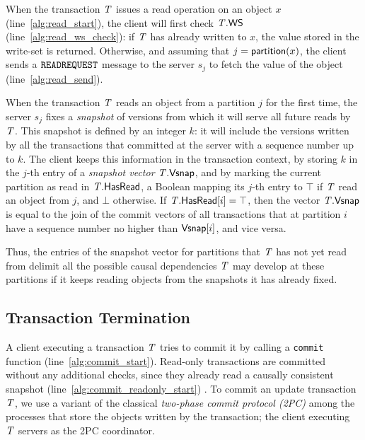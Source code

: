 When the transaction $\mathit{T}$ issues a read operation on an object $x$ (line~\ref{alg:read_start}), the client will first check $\mathit{T}.\mathsf{WS}$ (line~\ref{alg:read_ws_check}): if $\mathit{T}$ has already written to $x$, the value stored in the write-set is returned. Otherwise, and assuming that $j = \mathsf{partition}(x)$, the client sends a ${\tt READREQUEST}$ message to the server $s_j$ to fetch the value of the object (line~\ref{alg:read_send}).

When the transaction $\mathit{T}$ reads an object from a partition $j$ for the first time, the server $s_j$ fixes a \emph{snapshot} of versions from which it will serve all future reads by $\mathit{T}$. This snapshot is defined by an integer $k$: it will include the versions written by all the transactions that committed at the server with a sequence number up to $k$. The client keeps this information in the transaction context, by storing $k$ in the $j$-th entry of a \emph{snapshot vector} $\mathit{T}.\mathsf{Vsnap}$, and by marking the current partition as read in $\mathit{T}.\mathsf{HasRead}$, a Boolean mapping its $j$-th entry to $\top$ if $\mathit{T}$ read an object from $j$, and $\bot$ otherwise. If $\mathit{T}.\mathsf{HasRead}[i]=\top$, then the vector $\mathit{T}.\mathsf{Vsnap}$ is equal to the join of the commit vectors of all transactions that at partition $i$ have a sequence number no higher than $\mathsf{Vsnap}[i]$, and vice versa.

 Thus, the entries of the snapshot vector for partitions that $\mathit{T}$ has not yet read from delimit all the possible causal dependencies $\mathit{T}$ may develop at these partitions if it keeps reading objects from the snapshots it has already fixed.


\subsection{Transaction Termination}

A client executing a transaction $\mathit{T}$ tries to commit it by calling a {\tt commit} function (line~\ref{alg:commit_start}). Read-only transactions are committed without any additional checks, since they already read a causally consistent snapshot (line~\ref{alg:commit_readonly_start}) . To commit an update transaction $\mathit{T}$, we use a variant of the classical \emph{two-phase commit protocol (2PC)}  among the processes that store the objects written by the transaction; the client executing $\mathit{T}$ servers as the 2PC coordinator.


